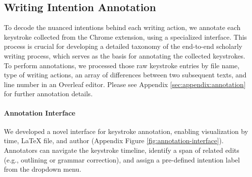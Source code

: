 
\subsection{Writing Intention Annotation}

To decode the nuanced intentions behind each writing action, we annotate each keystroke collected from the Chrome extension, using a specialized interface. This process is crucial for developing a detailed taxonomy of the end-to-end scholarly writing process, which serves as the basis for annotating the collected keystrokes. 
To perform annotations, we processed those raw keystroke entries by file name, type of writing actions, an array of differences between two subsequent texts, and line number in an Overleaf editor. Please see Appendix \ref{sec:appendix:annotation} for further annotation details.


\paragraph{Annotation Interface}\label{sec:annotation-interface}

We developed a novel interface for keystroke annotation, enabling visualization by time, LaTeX file, and author (Appendix Figure \ref{fig:annotation-interface}). Annotators can navigate the keystroke timeline, identify a span of related edits (e.g., outlining or grammar correction), and assign a pre-defined intention label from the dropdown menu. 



